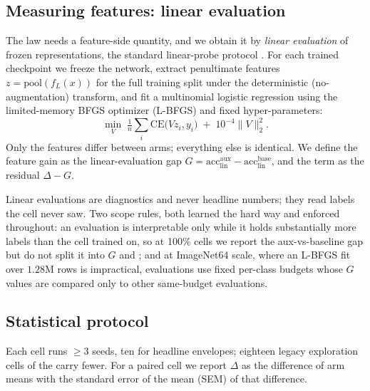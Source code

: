 \subsection{Measuring features: linear evaluation}\label{sec:probe}
The law needs a feature-side quantity, and we obtain it by \emph{linear
evaluation} of frozen representations, the standard linear-probe protocol
\citep{alain2016understanding}. For each trained checkpoint we freeze the
network, extract penultimate features $z = \mathrm{pool}(f_L(x))$ for the full
training split under the deterministic (no-augmentation) transform, and fit a
multinomial logistic regression using the limited-memory BFGS optimizer
(L-BFGS) and fixed hyper-parameters:
\begin{equation}
  \min_{V}\; \tfrac{1}{n}\!\sum_{i} \mathrm{CE}\bigl(Vz_i, y_i\bigr)
    \;+\; 10^{-4}\lVert V\rVert_2^2.
  \label{eq:probe}
\end{equation}
Only the features differ between arms; everything else is identical. We define
the feature gain as the linear-evaluation gap $G =
\mathrm{acc}_{\mathrm{lin}}^{\mathrm{aux}} -
\mathrm{acc}_{\mathrm{lin}}^{\mathrm{base}}$, and the \readout{} term as the
residual $\Delta - G$.

Linear evaluations are diagnostics and never headline numbers; they read labels
the cell never saw. Two scope rules, both learned the hard way and enforced
throughout: an evaluation is interpretable only while it holds substantially
more labels than the cell trained on, so at 100\% cells we report the
aux-vs-baseline gap but do not split it into $G$ and \readout; and at ImageNet64
scale, where an L-BFGS fit over $1.28$M rows is impractical, evaluations use
fixed per-class budgets whose $G$ values are compared only to other same-budget
evaluations.

\subsection{Statistical protocol}\label{sec:stats}
Each cell runs ${\geq}3$ seeds, ten for headline envelopes; eighteen legacy
exploration cells of the \computeCells{} carry fewer. For a paired cell
we report $\Delta$ as the difference of arm means with the standard error of
the mean (SEM) of that difference.

